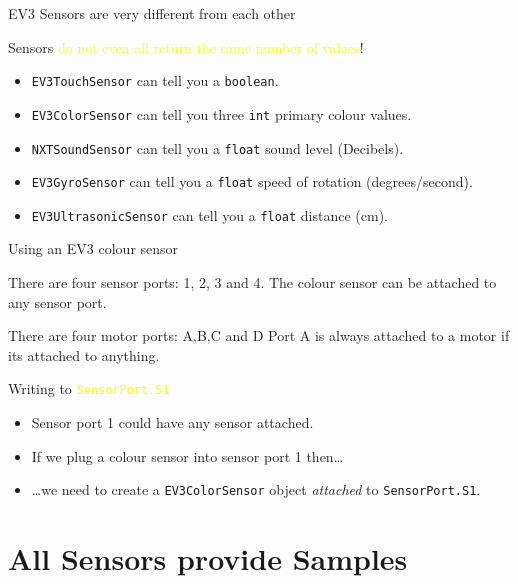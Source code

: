 \documentclass[color=pdftex,usenames,dvipsnames, aspectratio=169]{beamer}
\begin{document}
\begin{frame}{EV3 Sensors are very different from each other}
\begin{block}{Sensors \textcolor{yellow}{do not even all return the same number of values}!}
\begin{itemize}
\item \lstinline!EV3TouchSensor! can tell you a \lstinline!boolean!.
\item \lstinline!EV3ColorSensor! can tell you \alert{three} \lstinline!int! primary colour values.
\item \lstinline!NXTSoundSensor! can tell you a \lstinline!float! sound level (Decibels).
\item \lstinline!EV3GyroSensor! can tell you a \lstinline!float! speed of rotation (degrees/second).
\item \lstinline!EV3UltrasonicSensor! can tell you a \lstinline!float! distance (cm).
\end{itemize}
\end{block}
\end{frame}

\begin{frame}[fragile=singleslide]{Using an EV3 colour sensor}
\begin{block}{There are four sensor ports: 1, 2, 3 and 4.}
The colour sensor can be attached to any sensor port.  
\end{block}

\begin{block}{There are four motor ports: A,B,C and D}
Port A is always attached to a motor if its attached to anything.
\end{block}

\begin{block}{Writing to \textcolor{yellow}{\Verb!SensorPort.S1!}}
\begin{itemize}
\item Sensor port 1 could have any sensor attached.
\item If we plug a colour sensor into sensor port 1 then\dots
\item \dots we need to \alert{create} a \lstinline!EV3ColorSensor! object \emph{attached} to \lstinline!SensorPort.S1!.
\end{itemize}
\end{block}
\end{frame}

\section{All Sensors provide Samples}
\end{document}
